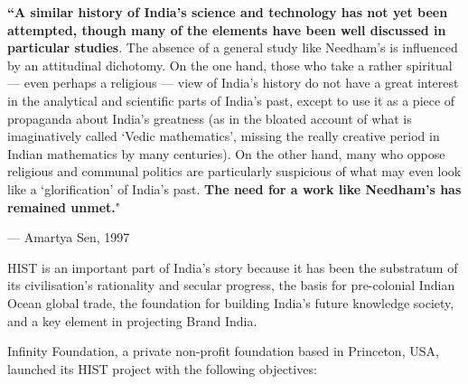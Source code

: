 \newpage

\begin{myquote}
\textbf{“A similar history of India’s science and technology has not yet been attempted, though many of the elements have been well discussed in particular studies}. The absence of a general study like Needham’s is influenced by an attitudinal dichotomy. On the one hand, those who take a rather spiritual — even perhaps a religious — view of India’s history do not have a great interest in the analytical and scientific parts of India’s past, except to use it as a piece of propaganda about India’s greatness (as in the bloated account of what is imaginatively called ‘Vedic mathematics’, missing the really creative period in Indian mathematics by many centuries). On the other hand, many who oppose religious and communal politics are particularly suspicious of what may even look like a ‘glorification’ of India’s past. \textbf{The need for a work like Needham’s has remained unmet.}"
\end{myquote}

\vspace{-.5cm}

\begin{flushright}
— Amartya Sen, 1997
\end{flushright}

\vspace{-.2cm}


HIST is an important part of India’s story because it has been the substratum of its civilisation’s rationality and secular progress, the basis for pre-colonial Indian Ocean global trade, the foundation for building India’s future knowledge society, and a key element in projecting Brand India.

Infinity Foundation, a private non-profit foundation based in Princeton, USA, launched its HIST project with the following objectives:

